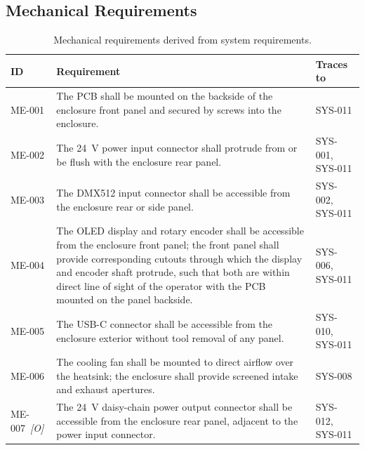\subsection{Mechanical Requirements}
\label{sec:req_mechanical}

\begin{table}[H]
  \caption{Mechanical requirements derived from system requirements.}
  \label{tab:req_mechanical}
  \centering
  \begin{tabularx}{\textwidth}{|l|X|l|}
    \hline
    \textbf{ID} & \textbf{Requirement} & \textbf{Traces to} \\ \hline \hline
    \label{req:me001}ME-001 &
      The \ac{PCB} shall be mounted on the backside of the enclosure front panel and secured by screws into the enclosure. &
      SYS-011 \\ \hline
    \label{req:me002}ME-002 &
      The \SI{24}{\volt} power input connector shall protrude from or be flush with the enclosure rear panel. &
      SYS-001, SYS-011 \\ \hline
    \label{req:me003}ME-003 &
      The \ac{DMX}512 input connector shall be accessible from the enclosure rear or side panel. &
      SYS-002, SYS-011 \\ \hline
    \label{req:me004}ME-004 &
      The \ac{OLED} display and rotary encoder shall be accessible from the enclosure front panel; the front panel shall provide corresponding cutouts through which the display and encoder shaft protrude, such that both are within direct line of sight of the operator with the \ac{PCB} mounted on the panel backside. &
      SYS-006, SYS-011 \\ \hline
    \label{req:me005}ME-005 &
      The \ac{USB}-C connector shall be accessible from the enclosure exterior without tool removal of any panel. &
      SYS-010, SYS-011 \\ \hline
    \label{req:me006}ME-006 &
      The cooling fan shall be mounted to direct airflow over the heatsink; the enclosure shall provide screened intake and exhaust apertures. &
      SYS-008 \\ \hline
    \label{req:me007}ME-007~\textit{[O]} &
      The \SI{24}{\volt} daisy-chain power output connector shall be accessible from the enclosure rear panel, adjacent to the power input connector. &
      SYS-012, SYS-011 \\ \hline
  \end{tabularx}
\end{table}
